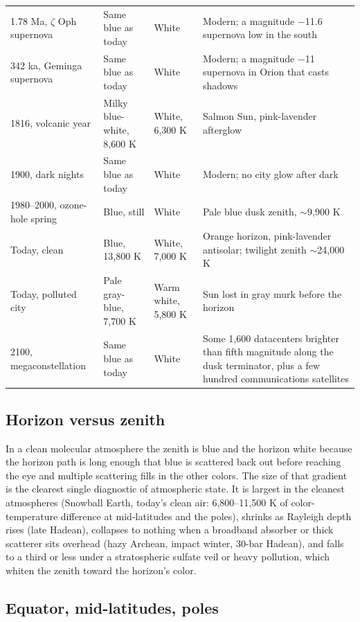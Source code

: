 \documentclass[9pt,twocolumn]{extarticle}
\begin{document}
\begin{table}[tp]
\begin{tabularx}{\textwidth}{@{}lYYY@{}}
1.78 Ma, $\zeta$ Oph supernova & Same blue as today & White & Modern; a magnitude $-$11.6 supernova low in the south \\
342 ka, Geminga supernova & Same blue as today & White & Modern; a magnitude $-$11 supernova in Orion that casts shadows \\
1816, volcanic year & Milky blue-white, 8,600 K & White, 6,300 K & Salmon Sun, pink-lavender afterglow \\
1900, dark nights & Same blue as today & White & Modern; no city glow after dark \\
1980--2000, ozone-hole spring & Blue, still & White & Pale blue dusk zenith, $\sim$9,900 K \\
Today, clean & Blue, 13,800 K & White, 7,000 K & Orange horizon, pink-lavender antisolar; twilight zenith $\sim$24,000 K \\
Today, polluted city & Pale gray-blue, 7,700 K & Warm white, 5,800 K & Sun lost in gray murk before the horizon \\
2100, megaconstellation & Same blue as today & White & Some 1,600 datacenters brighter than fifth magnitude along the dusk terminator, plus a few hundred communications satellites \\
\bottomrule\end{tabularx}
\end{table}


\subsection{Horizon versus zenith}\label{horizon-versus-zenith}

In a clean molecular atmosphere the zenith is blue and the horizon white because the horizon path is long enough that blue is scattered back out before reaching the eye and multiple scattering fills in the other colors. The size of that gradient is the clearest single diagnostic of atmospheric state. It is largest in the cleanest atmospheres (Snowball Earth, today's clean air: 6,800--11,500 K of color-temperature difference at mid-latitudes and the poles), shrinks as Rayleigh depth rises (late Hadean), collapses to nothing when a broadband absorber or thick scatterer sits overhead (hazy Archean, impact winter, 30-bar Hadean), and falls to a third or less under a stratospheric sulfate veil or heavy pollution, which whiten the zenith toward the horizon's color.


\subsection{Equator, mid-latitudes, poles}\label{equator-mid-latitudes-poles}
\end{document}
